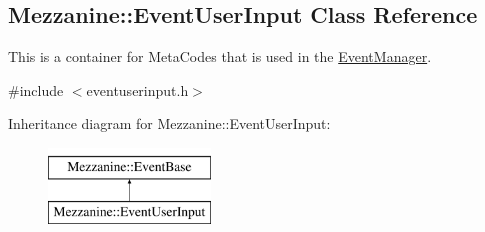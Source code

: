 \hypertarget{classMezzanine_1_1EventUserInput}{
\subsection{Mezzanine::EventUserInput Class Reference}
\label{classMezzanine_1_1EventUserInput}
}


This is a container for MetaCodes that is used in the \hyperlink{classMezzanine_1_1EventManager}{EventManager}.  




{\ttfamily \#include $<$eventuserinput.h$>$}

Inheritance diagram for Mezzanine::EventUserInput:\begin{figure}[H]
\begin{center}
\leavevmode
\includegraphics[height=2.000000cm]{classMezzanine_1_1EventUserInput}
\end{center}
\end{figure}
